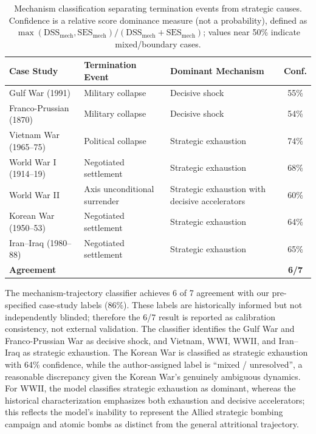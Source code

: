 \begin{table}[ht]
\centering
\caption{Mechanism classification separating termination events from strategic causes. Confidence is a relative score dominance measure (not a probability), defined as $\max(\text{DSS}_{\text{mech}}, \text{SES}_{\text{mech}}) / (\text{DSS}_{\text{mech}} + \text{SES}_{\text{mech}})$; values near 50\% indicate mixed/boundary cases.}
\label{tab:simulation}
\begin{tabularx}{\textwidth}{l X X c}
\toprule
\textbf{Case Study} & \textbf{Termination Event} & \textbf{Dominant Mechanism} & \textbf{Conf.} \\
\midrule
Gulf War (1991) & Military collapse & Decisive shock & 55\% \\
Franco-Prussian (1870) & Military collapse & Decisive shock & 54\% \\
Vietnam War (1965--75) & Political collapse & Strategic exhaustion & 74\% \\
World War I (1914--19) & Negotiated settlement & Strategic exhaustion & 68\% \\
World War II & Axis unconditional surrender & Strategic exhaustion with decisive accelerators & 60\% \\
Korean War (1950--53) & Negotiated settlement & Strategic exhaustion & 64\% \\
Iran--Iraq (1980--88) & Negotiated settlement & Strategic exhaustion & 65\% \\
\midrule
\textbf{Agreement} & & & \textbf{6/7} \\
\bottomrule
\end{tabularx}
\end{table}

The mechanism-trajectory classifier achieves 6 of 7 agreement with our pre-specified case-study labels (86\%). These labels are historically informed but not independently blinded; therefore the 6/7 result is reported as calibration consistency, not external validation. The classifier identifies the Gulf War and Franco-Prussian War as decisive shock, and Vietnam, WWI, WWII, and Iran--Iraq as strategic exhaustion. The Korean War is classified as strategic exhaustion with 64\% confidence, while the author-assigned label is ``mixed / unresolved'', a reasonable discrepancy given the Korean War's genuinely ambiguous dynamics. For WWII, the model classifies strategic exhaustion as dominant, whereas the historical characterization emphasizes both exhaustion and decisive accelerators; this reflects the model's inability to represent the Allied strategic bombing campaign and atomic bombs as distinct from the general attritional trajectory.

